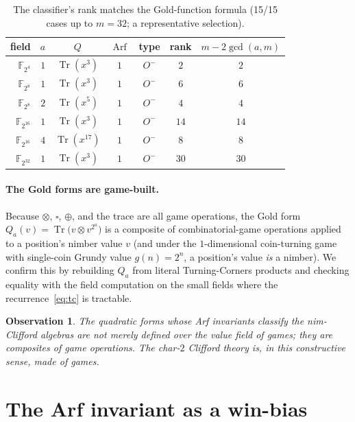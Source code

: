 \documentclass[11pt]{article}
\newtheorem{observation}{Observation}
\theoremstyle{definition}
\newcommand{\F}{\mathbb{F}}
\newcommand{\Tr}{\operatorname{Tr}}
\newcommand{\Arf}{\operatorname{Arf}}
\newcommand{\nimmul}{\otimes}
\begin{document}
\begin{table}[h]
\centering
\begin{tabular}{rrccccc}
\toprule
field & $a$ & $Q$ & $\Arf$ & type & rank & $m-2\gcd(a,m)$ \\
\midrule
$\F_{2^{4}}$  & $1$ & $\Tr(x^3)$    & $1$ & $O^-$ & $2$  & $2$ \\
$\F_{2^{8}}$  & $1$ & $\Tr(x^3)$    & $1$ & $O^-$ & $6$  & $6$ \\
$\F_{2^{8}}$  & $2$ & $\Tr(x^5)$    & $1$ & $O^-$ & $4$  & $4$ \\
$\F_{2^{16}}$ & $1$ & $\Tr(x^3)$    & $1$ & $O^-$ & $14$ & $14$ \\
$\F_{2^{16}}$ & $4$ & $\Tr(x^{17})$ & $1$ & $O^-$ & $8$  & $8$ \\
$\F_{2^{32}}$ & $1$ & $\Tr(x^3)$    & $1$ & $O^-$ & $30$ & $30$ \\
\bottomrule
\end{tabular}
\caption{The classifier's rank matches the Gold-function formula
(15/15 cases up to $m=32$; a representative selection).}
\label{tab:gold}
\end{table}

\paragraph{The Gold forms are game-built.}
Because $\nimmul$, $\square$, $\oplus$, and the trace are all game operations,
the Gold form
\(
  Q_a(v) = \Tr\!\bigl(v \nimmul v^{2^a}\bigr)
\)
is a composite of combinatorial-game operations applied to a position's nimber
value $v$ (and under the $1$-dimensional coin-turning game with single-coin
Grundy value $g(n)=2^n$, a position's value \emph{is} a nimber). We confirm this
by rebuilding $Q_a$ from literal Turning-Corners products and checking equality
with the field computation on the small fields where the
recurrence~\eqref{eq:tc} is tractable.

\begin{observation}\label{obs:built}
The quadratic forms whose Arf invariants classify the nim-Clifford algebras are
not merely defined over the value field of games; they are composites of game
operations. The char-$2$ Clifford theory is, in this constructive sense, made of
games.
\end{observation}

\section{The Arf invariant as a win-bias}
\end{document}
